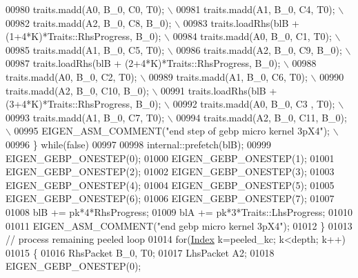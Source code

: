 \begin{DoxyCode}
00980 \textcolor{preprocessor}{              traits.madd(A0, B\_0, C0, T0); \(\backslash\)}
00981 \textcolor{preprocessor}{              traits.madd(A1, B\_0, C4, T0); \(\backslash\)}
00982 \textcolor{preprocessor}{              traits.madd(A2, B\_0, C8, B\_0); \(\backslash\)}
00983 \textcolor{preprocessor}{              traits.loadRhs(blB + (1+4*K)*Traits::RhsProgress, B\_0); \(\backslash\)}
00984 \textcolor{preprocessor}{              traits.madd(A0, B\_0, C1, T0); \(\backslash\)}
00985 \textcolor{preprocessor}{              traits.madd(A1, B\_0, C5, T0); \(\backslash\)}
00986 \textcolor{preprocessor}{              traits.madd(A2, B\_0, C9, B\_0); \(\backslash\)}
00987 \textcolor{preprocessor}{              traits.loadRhs(blB + (2+4*K)*Traits::RhsProgress, B\_0); \(\backslash\)}
00988 \textcolor{preprocessor}{              traits.madd(A0, B\_0, C2,  T0); \(\backslash\)}
00989 \textcolor{preprocessor}{              traits.madd(A1, B\_0, C6,  T0); \(\backslash\)}
00990 \textcolor{preprocessor}{              traits.madd(A2, B\_0, C10, B\_0); \(\backslash\)}
00991 \textcolor{preprocessor}{              traits.loadRhs(blB + (3+4*K)*Traits::RhsProgress, B\_0); \(\backslash\)}
00992 \textcolor{preprocessor}{              traits.madd(A0, B\_0, C3 , T0); \(\backslash\)}
00993 \textcolor{preprocessor}{              traits.madd(A1, B\_0, C7,  T0); \(\backslash\)}
00994 \textcolor{preprocessor}{              traits.madd(A2, B\_0, C11, B\_0); \(\backslash\)}
00995 \textcolor{preprocessor}{              EIGEN\_ASM\_COMMENT("end step of gebp micro kernel 3pX4"); \(\backslash\)}
00996 \textcolor{preprocessor}{            \} while(false)}
00997 
00998             internal::prefetch(blB);
00999             EIGEN\_GEBP\_ONESTEP(0);
01000             EIGEN\_GEBP\_ONESTEP(1);
01001             EIGEN\_GEBP\_ONESTEP(2);
01002             EIGEN\_GEBP\_ONESTEP(3);
01003             EIGEN\_GEBP\_ONESTEP(4);
01004             EIGEN\_GEBP\_ONESTEP(5);
01005             EIGEN\_GEBP\_ONESTEP(6);
01006             EIGEN\_GEBP\_ONESTEP(7);
01007 
01008             blB += pk*4*RhsProgress;
01009             blA += pk*3*Traits::LhsProgress;
01010 
01011             EIGEN\_ASM\_COMMENT(\textcolor{stringliteral}{"end gebp micro kernel 3pX4"});
01012           \}
01013           \textcolor{comment}{// process remaining peeled loop}
01014           \textcolor{keywordflow}{for}(\hyperlink{namespace_eigen_a62e77e0933482dafde8fe197d9a2cfde}{Index} k=peeled\_kc; k<depth; k++)
01015           \{
01016             RhsPacket B\_0, T0;
01017             LhsPacket A2;
01018             EIGEN\_GEBP\_ONESTEP(0);

\end{DoxyCode}

